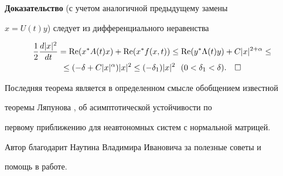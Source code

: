 {\bf Доказательство} (с учетом аналогичной предыдущему замены 


$x=U(t)y$) следует из дифференциального неравенства


\begin{multline*}


\frac{1}{2}\frac{d|x|^2}{d t}=\re(x^*A(t)x)+\re


(x^*f(x,t))\le\re(y^*\Lambda(t)y)+C|x|^{2+\alpha}\le \\


\le(-\delta+C|x|^\alpha)|x|^2\le(-\delta_1)|x|^2


\ \ (0<\delta_1<\delta).\quad\square


\end{multline*}





Последняя теорема является в определенном смысле обобщением известной 


теоремы Ляпунова \cite{1}, \cite{2} об асимптотической устойчивости по 


первому приближению для неавтономных систем с нормальной матрицей.








Автор благодарит Наутина Владимира Ивановича за полезные советы и 


помощь в работе.











